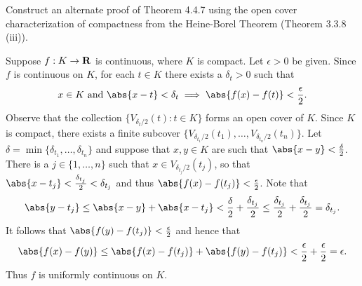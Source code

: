 \documentclass{lew98_solutions}
\begin{document}
\begin{exercise}
\label{ex:4.4.14}
    Construct an alternate proof of Theorem 4.4.7 using the open cover characterization of compactness from the Heine-Borel Theorem (Theorem 3.3.8 (iii)).
\end{exercise}

\begin{solution}
    Suppose \( f : K \to \mathbf{R} \) is continuous, where \( K \) is compact. Let \( \epsilon > 0 \) be given. Since \( f \) is continuous on \( K \), for each \( t \in K \) there exists a \( \delta_t > 0 \) such that
    \[
        x \in K \text{ and } \abs{x - t} < \delta_t \implies \abs{f(x) - f(t)} < \frac{\epsilon}{2}.
    \]
    Observe that the collection \( \{ V_{\delta_t/2}(t) : t \in K \} \) forms an open cover of \( K \). Since \( K \) is compact, there exists a finite subcover \( \{ V_{\delta_{t_1}/2}(t_1), \ldots, V_{\delta_{t_n}/2}(t_n) \} \). Let \( \delta = \min \{ \delta_{t_1}, \ldots, \delta_{t_n} \} \) and suppose that \( x, y \in K \) are such that \( \abs{x - y} < \frac{\delta}{2} \). There is a \( j \in \{ 1, \ldots, n \} \) such that \( x \in V_{\delta_{t_j}/2}(t_j) \), so that \( \abs{x - t_j} < \frac{\delta_{t_j}}{2} < \delta_{t_j} \) and thus \( \abs{f(x) - f(t_j)} < \tfrac{\epsilon}{2} \). Note that
    \[
        \abs{y - t_j} \leq \abs{x - y} + \abs{x - t_j} < \frac{\delta}{2} + \frac{\delta_{t_j}}{2} \leq \frac{\delta_{t_j}}{2} + \frac{\delta_{t_j}}{2} = \delta_{t_j}.
    \]
    It follows that \( \abs{f(y) - f(t_j)} < \tfrac{\epsilon}{2} \) and hence that
    \[
        \abs{f(x) - f(y)} \leq \abs{f(x) - f(t_j)} + \abs{f(y) - f(t_j)} < \frac{\epsilon}{2} + \frac{\epsilon}{2} = \epsilon.
    \]
    Thus \( f \) is uniformly continuous on \( K \).
\end{solution}
\end{document}
